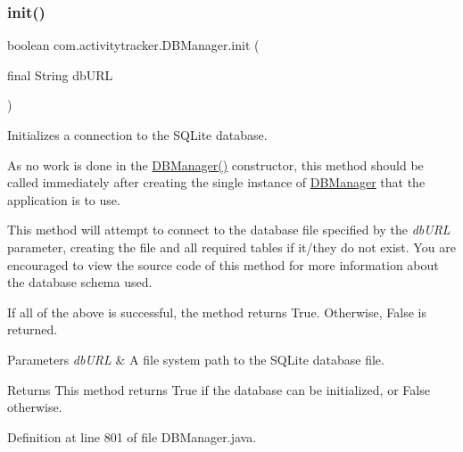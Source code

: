 \subsubsection{\texorpdfstring{init()}{init()}}
{\footnotesize\ttfamily boolean com.\+activitytracker.\+D\+B\+Manager.\+init (\begin{DoxyParamCaption}\item[{final String}]{db\+U\+RL }\end{DoxyParamCaption})\hspace{0.3cm}{\ttfamily [package]}}

Initializes a connection to the S\+Q\+Lite database.

As no work is done in the \mbox{\hyperlink{classcom_1_1activitytracker_1_1_d_b_manager_ac1f558ef56fe02d74fe103a473a15bb5}{D\+B\+Manager()}} constructor, this method should be called immediately after creating the single instance of \mbox{\hyperlink{classcom_1_1activitytracker_1_1_d_b_manager}{D\+B\+Manager}} that the application is to use.

This method will attempt to connect to the database file specified by the {\itshape db\+U\+RL} parameter, creating the file and all required tables if it/they do not exist. You are encouraged to view the source code of this method for more information about the database schema used.

If all of the above is successful, the method returns True. Otherwise, False is returned.


\begin{DoxyParams}{Parameters}
{\em db\+U\+RL} & A file system path to the S\+Q\+Lite database file.\\
\hline
\end{DoxyParams}
\begin{DoxyReturn}{Returns}
This method returns True if the database can be initialized, or False otherwise. 
\end{DoxyReturn}


Definition at line 801 of file D\+B\+Manager.\+java.



